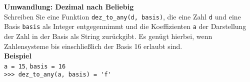 \textbf{Umwandlung: Dezimal nach Beliebig}\\
Schreiben Sie eine Funktion \verb|dez_to_any(d, basis)|, die
eine Zahl \verb|d| und eine Basis \verb|basis| als Integer entgegennimmt und die
Koeffizienten \verb|a| der Darstellung der Zahl in der Basis als String zurückgibt. Es genügt hierbei, wenn Zahlensysteme bis einschließlich der Basis 16 erlaubt sind.\\

\textbf{Beispiel} \\
\verb|a = 15|, \verb|basis = 16| \\
\verb|>>> dez_to_any(a, basis) = 'f'|